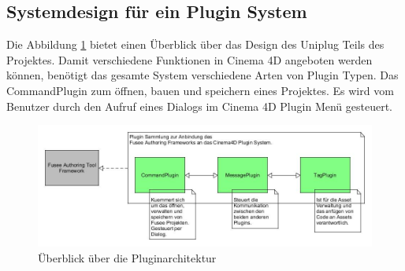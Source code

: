 \documentclass[pagesize, paper=a4, fontsize=12pt, titlepage=true, headings=small, headnosepline, abstractoff, liststotoc, nochapterprefix, plainheadsepline, twoside]{scrreprt}
\begin{document}
\subsection{Systemdesign für ein Plugin System}
Die Abbildung \ref{ÜberblickPluginArchitektur} bietet einen Überblick über das Design des Uniplug Teils des Projektes. Damit verschiedene Funktionen in Cinema 4D angeboten werden können, benötigt das gesamte System verschiedene Arten von Plugin Typen. Das CommandPlugin zum öffnen, bauen und speichern eines Projektes. Es wird vom Benutzer durch den Aufruf eines Dialogs im Cinema 4D Plugin Menü gesteuert.

\begin{figure}[ht]
	\centering
	\includegraphics[width=\linewidth]{Bilder/Ueberblick_Plugins.jpg}
	\caption{Überblick über die Pluginarchitektur}
	\label{ÜberblickPluginArchitektur}
\end{figure}
\end{document}
